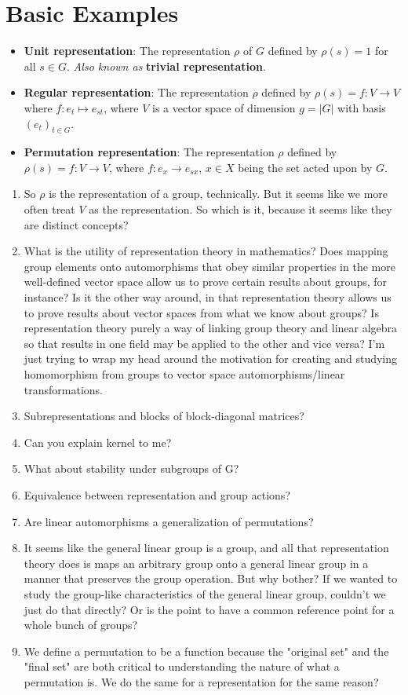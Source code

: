 \documentclass[../notes.tex]{subfiles}
\begin{document}
\section{Basic Examples}
\begin{itemize}
    \item \textbf{Unit representation}: The representation $\rho$ of $G$ defined by $\rho(s)=1$ for all $s\in G$. \emph{Also known as} \textbf{trivial representation}.
    \item \textbf{Regular representation}: The representation $\rho$ defined by $\rho(s)=f:V\to V$ where $f:e_t\mapsto e_{st}$, where $V$ is a vector space of dimension $g=|G|$ with basis $(e_t)_{t\in G}$.
    \item \textbf{Permutation representation}: The representation $\rho$ defined by $\rho(s)=f:V\to V$, where $f:e_x\to e_{sx}$, $x\in X$ being the set acted upon by $G$.
\end{itemize}


\begin{enumerate}
    \item So $\rho$ is the representation of a group, technically. But it seems like we more often treat $V$ as the representation. So which is it, because it seems like they are distinct concepts?
    \item What is the utility of representation theory in mathematics? Does mapping group elements onto automorphisms that obey similar properties in the more well-defined vector space allow us to prove certain results about groups, for instance? Is it the other way around, in that representation theory allows us to prove results about vector spaces from what we know about groups? Is representation theory purely a way of linking group theory and linear algebra so that results in one field may be applied to the other and vice versa? I'm just trying to wrap my head around the motivation for creating and studying homomorphism from groups to vector space automorphisms/linear transformations.
    \item Subrepresentations and blocks of block-diagonal matrices?
    \item Can you explain kernel to me?
    \item What about stability under subgroups of G?
    \item Equivalence between representation and group actions?
    \item Are linear automorphisms a generalization of permutations?
    \item It seems like the general linear group is a group, and all that representation theory does is maps an arbitrary group onto a general linear group in a manner that preserves the group operation. But why bother? If we wanted to study the group-like characteristics of the general linear group, couldn't we just do that directly? Or is the point to have a common reference point for a whole bunch of groups?
    \item We define a permutation to be a function because the "original set" and the "final set" are both critical to understanding the nature of what a permutation is. We do the same for a representation for the same reason?
\end{enumerate}
\end{document}
